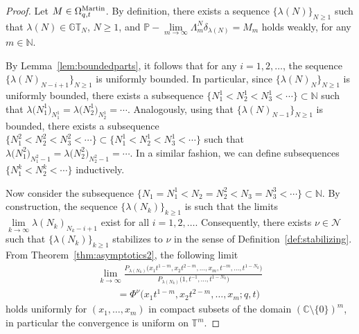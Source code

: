\documentclass[pdftex]{sigma}
\numberwithin{equation}{section}
\newcommand{\C}{\mathbb{C}}
\newcommand{\N}{\mathbb{N}}
\newcommand{\Nu}{\mathcal{N}}
\newcommand{\GT}{\mathbb{GT}}
\newcommand{\TT}{\mathbb{T}}
\begin{document}
\begin{proof}
Let $M\in\Omega_{q, t}^{{\rm Martin}}$. By def\/inition, there exists a sequence $\{\lambda(N)\}_{N \geq 1}$ such that $\lambda(N)\in\GT_N$, $N \geq 1$, and $\mathbb{P}-\lim\limits_{m\rightarrow\infty}{\Lambda^N_m \delta_{\lambda(N)}} = M_m$ holds weakly, for any $m\in\N$.

By Lemma~\ref{lem:boundedparts}, it follows that for any $i = 1, 2, \dots$, the sequence $\{\lambda(N)_{N-i+1}\}_{N\geq 1}$ is uniformly bounded. In particular, since $\{\lambda(N)_N\}_{N\geq 1}$ is uniformly bounded, there exists a subsequence $\big\{N^1_1 < N^1_2 < N^1_3 < \cdots\big\}\subset\N$ such that $\lambda\big(N^1_1\big)_{N^1_1} = \lambda\big(N^1_2\big)_{N^1_2} = \cdots$. Analogously, using that $\{\lambda(N)_{N-1}\}_{N \geq 1}$ is bounded, there exists a subsequence $\big\{N^2_1 < N^2_2 < N^2_3 < \cdots\big\} \subset \big\{N^1_1 < N^1_2 < N^1_3 < \cdots\big\}$ such that $\lambda\big(N^2_1\big)_{N^2_1-1} = \lambda\big(N^2_2\big)_{N^2_2-1} = \cdots$. In a similar fashion, we can def\/ine subsequences $\big\{N^k_1 < N^k_2 < \cdots\big\}$ inductively.

Now consider the subsequence $\big\{N_1 = N^1_1 < N_2 = N^2_2 < N_3 = N_3^3 < \cdots\big\} \subset \N$. By construction, the sequence $\{\lambda(N_k)\}_{k\geq 1}$ is such that the limits $\lim\limits_{k\rightarrow\infty}{\lambda(N_k)_{N_k - i + 1}}$ exist for all $i = 1, 2, \dots$. Consequently, there exists $\nu\in\Nu$ such that $\{\lambda(N_k)\}_{k\geq 1}$ stabilizes to $\nu$ in the sense of Def\/inition~\ref{def:stabilizing}. From Theorem~\ref{thm:asymptotics2}, the following limit
\begin{gather}
\lim_{k\rightarrow\infty}{ \frac{P_{\lambda(N_k)}\big(x_1 t^{1-m}, x_2 t^{2-m}, \dots, x_m, t^{-m}, \dots, t^{1 - N_k}\big)}{P_{\lambda(N_k)}\big(1, t^{-1}, \dots, t^{1 - N_k}\big)} }\nonumber\\
\qquad{} = \Phi^{\nu}\big(x_1 t^{1-m}, x_2 t^{2-m}, \dots, x_m; q, t\big)\label{eqn:limitsPhi}
\end{gather}
holds uniformly for $(x_1, \dots, x_m)$ in compact subsets of the domain $(\C \setminus \{0\})^m$, in particular the convergence is uniform on $\TT^m$.


\end{proof}
\end{document}
